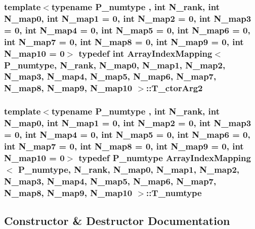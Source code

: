 \subsubsection[{T\+\_\+ctor\+Arg2}]{\setlength{\rightskip}{0pt plus 5cm}template$<$typename P\+\_\+numtype , int N\+\_\+rank, int N\+\_\+map0, int N\+\_\+map1 = 0, int N\+\_\+map2 = 0, int N\+\_\+map3 = 0, int N\+\_\+map4 = 0, int N\+\_\+map5 = 0, int N\+\_\+map6 = 0, int N\+\_\+map7 = 0, int N\+\_\+map8 = 0, int N\+\_\+map9 = 0, int N\+\_\+map10 = 0$>$ typedef int {\bf Array\+Index\+Mapping}$<$ P\+\_\+numtype, N\+\_\+rank, N\+\_\+map0, N\+\_\+map1, N\+\_\+map2, N\+\_\+map3, N\+\_\+map4, N\+\_\+map5, N\+\_\+map6, N\+\_\+map7, N\+\_\+map8, N\+\_\+map9, N\+\_\+map10 $>$\+::{\bf T\+\_\+ctor\+Arg2}}\label{classArrayIndexMapping_a075b000a9bf0680c71b6299c05d04124}
\hypertarget{classArrayIndexMapping_a650b2e3c2658a771235ae3cc4692e331}{}
\subsubsection[{T\+\_\+numtype}]{\setlength{\rightskip}{0pt plus 5cm}template$<$typename P\+\_\+numtype , int N\+\_\+rank, int N\+\_\+map0, int N\+\_\+map1 = 0, int N\+\_\+map2 = 0, int N\+\_\+map3 = 0, int N\+\_\+map4 = 0, int N\+\_\+map5 = 0, int N\+\_\+map6 = 0, int N\+\_\+map7 = 0, int N\+\_\+map8 = 0, int N\+\_\+map9 = 0, int N\+\_\+map10 = 0$>$ typedef P\+\_\+numtype {\bf Array\+Index\+Mapping}$<$ P\+\_\+numtype, N\+\_\+rank, N\+\_\+map0, N\+\_\+map1, N\+\_\+map2, N\+\_\+map3, N\+\_\+map4, N\+\_\+map5, N\+\_\+map6, N\+\_\+map7, N\+\_\+map8, N\+\_\+map9, N\+\_\+map10 $>$\+::{\bf T\+\_\+numtype}}\label{classArrayIndexMapping_a650b2e3c2658a771235ae3cc4692e331}


\subsection{Constructor \& Destructor Documentation}
\hypertarget{classArrayIndexMapping_a92790fcabe0348640004fc48e2c07882}{}
